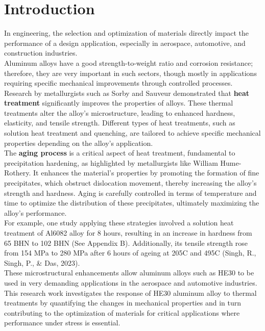 \documentclass{article}
\begin{document}
    
    \newpage\vspace*{-20pt}
    \section{Introduction}

        In engineering, the selection and optimization of materials directly impact the performance of a design application, especially in aerospace, automotive, and construction industries. \\[8pt]
        \noindent
        Aluminum alloys have a good strength-to-weight ratio and corrosion resistance; therefore, they are very important in such sectors, though mostly in applications requiring specific mechanical improvements through controlled processes. \\[8pt]
        \noindent
        Research by metallurgists such as Sorby and Sauveur demonstrated that \textbf{heat treatment} significantly improves the properties of alloys. These thermal treatments alter the alloy's microstructure, leading to enhanced hardness, elasticity, and tensile strength. Different types of heat treatments, such as solution heat treatment and quenching, are tailored to achieve specific mechanical properties depending on the alloy’s application.\\[8pt]
        \noindent
        The \textbf{aging process} is a critical aspect of heat treatment, fundamental to precipitation hardening, as highlighted by metallurgists like William Hume-Rothery. It enhances the material's properties by promoting the formation of fine precipitates, which obstruct dislocation movement, thereby increasing the alloy's strength and hardness. Aging is carefully controlled in terms of temperature and time to optimize the distribution of these precipitates, ultimately maximizing the alloy’s performance.\\[8pt]
        \noindent
        For example, one study applying these strategies involved a solution heat treatment of Al6082 alloy for 8 hours, resulting in an increase in hardness from 65 BHN to 102 BHN (See Appendix B). Additionally, its tensile strength rose from 154 MPa to 280 MPa after 6 hours of ageing at 205\textdegree C and 495\textdegree C (Singh, R., Singh, P., \& Das, 2023).\\[8pt]
        \noindent
        These microstructural enhancements allow aluminum alloys such as HE30 to be used in very demanding applications in the aerospace and automotive industries.\\[8pt]
        \noindent
        This research work investigates the response of HE30 aluminum alloy to thermal treatments by quantifying the changes in mechanical properties and in turn contributing to the optimization of materials for critical applications where performance under stress is essential. 
    
\end{document}
